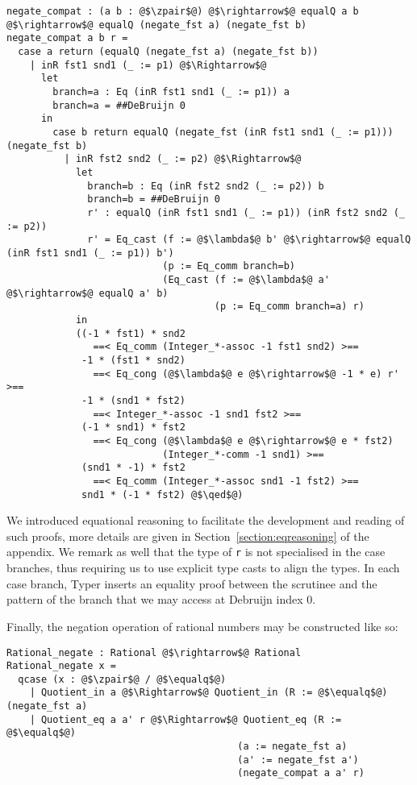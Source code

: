\documentclass[12pt,twoside,maitrise]{dms}
\theoremstyle{definition}
\numberwithin{equation}{section}
\numberwithin{table}{chapter}
\numberwithin{figure}{chapter}
\newcommand\id[1] {\texttt{#1}}
\renewcommand\qed{\blacksquare}
\begin{document}
\begin{verbatim}
negate_compat : (a b : @$\zpair$@) @$\rightarrow$@ equalQ a b @$\rightarrow$@ equalQ (negate_fst a) (negate_fst b)
negate_compat a b r =
  case a return (equalQ (negate_fst a) (negate_fst b))
    | inR fst1 snd1 (_ := p1) @$\Rightarrow$@
      let
        branch=a : Eq (inR fst1 snd1 (_ := p1)) a
        branch=a = ##DeBruijn 0
      in
        case b return equalQ (negate_fst (inR fst1 snd1 (_ := p1))) (negate_fst b)
          | inR fst2 snd2 (_ := p2) @$\Rightarrow$@
            let
              branch=b : Eq (inR fst2 snd2 (_ := p2)) b
              branch=b = ##DeBruijn 0
              r' : equalQ (inR fst1 snd1 (_ := p1)) (inR fst2 snd2 (_ := p2))
              r' = Eq_cast (f := @$\lambda$@ b' @$\rightarrow$@ equalQ (inR fst1 snd1 (_ := p1)) b')
                           (p := Eq_comm branch=b)
                           (Eq_cast (f := @$\lambda$@ a' @$\rightarrow$@ equalQ a' b)
                                    (p := Eq_comm branch=a) r)
            in
            ((-1 * fst1) * snd2
               ==< Eq_comm (Integer_*-assoc -1 fst1 snd2) >==
             -1 * (fst1 * snd2)
               ==< Eq_cong (@$\lambda$@ e @$\rightarrow$@ -1 * e) r' >==
             -1 * (snd1 * fst2)
               ==< Integer_*-assoc -1 snd1 fst2 >==
             (-1 * snd1) * fst2
               ==< Eq_cong (@$\lambda$@ e @$\rightarrow$@ e * fst2)
                           (Integer_*-comm -1 snd1) >==
             (snd1 * -1) * fst2
               ==< Eq_comm (Integer_*-assoc snd1 -1 fst2) >==
             snd1 * (-1 * fst2) @$\qed$@)
\end{verbatim}

We introduced equational reasoning to facilitate the development and reading of
such proofs, more details are given in Section~\ref{section:eqreasoning} of the
appendix. We remark as well that the type of \id{r} is not specialised in the
case branches, thus requiring us to use explicit type casts to align the types.
In each case branch, Typer inserts an equality proof between the scrutinee and
the pattern of the branch that we may access at Debruijn index 0.

Finally, the negation operation of rational numbers may be constructed like so:

\begin{verbatim}
Rational_negate : Rational @$\rightarrow$@ Rational
Rational_negate x =
  qcase (x : @$\zpair$@ / @$\equalq$@)
    | Quotient_in a @$\Rightarrow$@ Quotient_in (R := @$\equalq$@) (negate_fst a)
    | Quotient_eq a a' r @$\Rightarrow$@ Quotient_eq (R := @$\equalq$@)
                                        (a := negate_fst a)
                                        (a' := negate_fst a')
                                        (negate_compat a a' r)
\end{verbatim}
\end{document}
